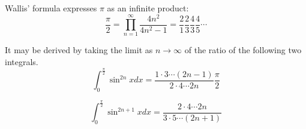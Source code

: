 \documentclass[12pt]{article}
\begin{document}
Wallis' formula expresses $\pi$ as an infinite product:
$$\frac{\pi}{2} = \prod_{n = 1}^{\infty} \frac{4n^{2}}{4n^{2} - 1} = \frac{2}{1}\frac{2}{3}\frac{4}{3}\frac{4}{5} \cdots$$

It may be derived by taking the limit as $n \to \infty$ of the ratio of the following
two integrals.
$$\int_{0}^{\frac{\pi}{2}} \sin^{2n}x dx = \frac{1 \cdot 3 \cdots (2n - 1)}{2 \cdot 4 \cdots 2n} \frac{\pi}{2}$$

$$\int_{0}^{\frac{\pi}{2}} \sin^{2n + 1}x dx = \frac{2 \cdot 4 \cdots 2n}{3 \cdot 5 \cdots (2n + 1)}$$


\end{document}
